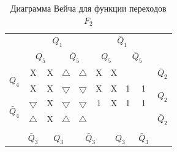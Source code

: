 \documentclass[a4paper,14pt]{article}
\begin{document}
\begin{table}[H]
	\begin{center}
		\caption{\label{tab:F2_tab} Диаграмма Вейча для функции переходов $F_2$ }
		\begin{tabular}{cccccccccc}
			& \multicolumn{4}{c}{$Q_1$} & \multicolumn{4}{c}{$\bar{Q}_1$} &  \\
			& \multicolumn{2}{c}{$Q_5$} & \multicolumn{2}{c}{$\bar{Q}_5$} & \multicolumn{2}{c}{$Q_5$} & \multicolumn{2}{c}{$\bar{Q}_5$} &  \\ \cline{2-9}
			\multicolumn{1}{c|}{\multirow{2}{*}{$Q_4$}} & \multicolumn{1}{c|}{X} & \multicolumn{1}{c|}{X} & \multicolumn{1}{c|}{$\bigtriangleup$} & \multicolumn{1}{c|}{$\bigtriangleup$} & \multicolumn{1}{c|}{X} & \multicolumn{1}{c|}{X} & \multicolumn{1}{c|}{} & \multicolumn{1}{c|}{} & $\bar{Q}_2$ \\ \cline{2-9}
			\multicolumn{1}{c|}{} & \multicolumn{1}{c|}{X} & \multicolumn{1}{c|}{X} & \multicolumn{1}{c|}{$\bigtriangledown$} & \multicolumn{1}{c|}{$\bigtriangledown$} & \multicolumn{1}{c|}{X} & \multicolumn{1}{c|}{X} & \multicolumn{1}{c|}{1} & \multicolumn{1}{c|}{1} & \multirow{2}{*}{$Q_2$} \\ \cline{2-9}
			\multicolumn{1}{c|}{\multirow{2}{*}{$\bar{Q}_4$}} & \multicolumn{1}{c|}{$\bigtriangledown$} & \multicolumn{1}{c|}{X} & \multicolumn{1}{c|}{$\bigtriangledown$} & \multicolumn{1}{c|}{$\bigtriangledown$} & \multicolumn{1}{c|}{1} & \multicolumn{1}{c|}{X} & \multicolumn{1}{c|}{1} & \multicolumn{1}{c|}{1} &  \\ \cline{2-9}
			\multicolumn{1}{c|}{} & \multicolumn{1}{c|}{$\bigtriangleup$} & \multicolumn{1}{c|}{X} & \multicolumn{1}{c|}{$\bigtriangleup$} & \multicolumn{1}{c|}{$\bigtriangleup$} & \multicolumn{1}{c|}{} & \multicolumn{1}{c|}{} & \multicolumn{1}{c|}{} & \multicolumn{1}{c|}{} & $\bar{Q}_2$ \\ \cline{2-9}
			&  & \multicolumn{2}{c}{} & \multicolumn{2}{c}{} & \multicolumn{2}{c}{} &  &  \\
			& $\bar{Q}_3$ & \multicolumn{2}{c}{$Q_3$} & \multicolumn{2}{c}{$\bar{Q}_3$} & \multicolumn{2}{c}{$Q_3$} & $\bar{Q}_3$ & 
		\end{tabular}
	\end{center}
\end{table}

\end{document}
